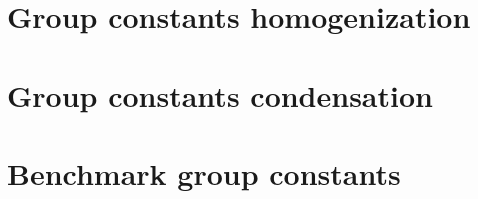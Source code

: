 \section{Group constants homogenization}
\label{appendix:group-const-homo}


\section{Group constants condensation}
\label{appendix:group-const-condense}


\section{Benchmark group constants}

